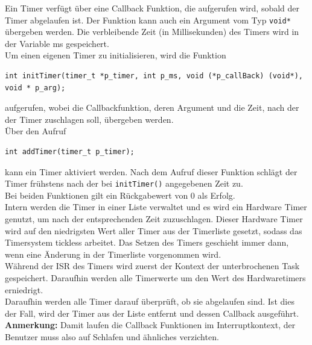 \documentclass[fontsize=12pt, toc=bibliography, notitlepage]{scrreprt}
\begin{document}
Ein Timer verfügt über eine Callback Funktion, die aufgerufen wird, sobald der Timer abgelaufen ist. Der Funktion kann auch ein Argument vom Typ \lstinline$void*$ übergeben werden. Die verbleibende Zeit (in Millisekunden) des Timers wird in der Variable ms gespeichert.\\

Um einen eigenen Timer zu initialisieren, wird die Funktion

\begin{lstlisting}[title=timer.h]
int initTimer(timer_t *p_timer, int p_ms, void (*p_callBack) (void*), void * p_arg);
\end{lstlisting}

aufgerufen, wobei die Callbackfunktion, deren Argument und die Zeit, nach der der Timer zuschlagen soll, übergeben werden.\\
Über den Aufruf

\begin{lstlisting}[title=timer.h]
int addTimer(timer_t p_timer);
\end{lstlisting}

kann ein Timer aktiviert werden. Nach dem Aufruf dieser Funktion schlägt der Timer frühstens nach der bei \lstinline$initTimer()$ angegebenen Zeit zu.\\
Bei beiden Funktionen gilt ein Rückgabewert von 0 als Erfolg.\\
Intern werden die Timer in einer Liste verwaltet und es wird ein Hardware Timer genutzt, um nach der entsprechenden Zeit zuzuschlagen. Dieser Hardware Timer wird auf den niedrigsten Wert aller Timer aus der Timerliste gesetzt, sodass das Timersystem tickless arbeitet. Das Setzen des Timers geschieht immer dann, wenn eine Änderung in der Timerliste vorgenommen wird.\\
Während der ISR des Timers wird zuerst der Kontext der unterbrochenen Task gespeichert. Daraufhin werden alle Timerwerte um den Wert des Hardwaretimers erniedrigt.\\
Daraufhin werden alle Timer darauf überprüft, ob sie abgelaufen sind. Ist dies der Fall, wird der Timer aus der Liste entfernt und dessen Callback ausgeführt.\\

\textbf{Anmerkung:} Damit laufen die Callback Funktionen im Interruptkontext, der Benutzer muss also auf Schlafen und ähnliches verzichten.
\end{document}
